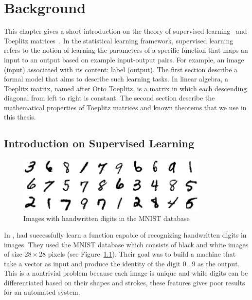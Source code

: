 \chapter{Background}
\label{chapter:background}
\localtableofcontents
\vspace{\marginbellowtable}

This chapter gives a short introduction on the theory of supervised learning~\cite{shalev2014understanding} and Toeplitz matrices~\cite{gray2006toeplitz}.
In the statistical learning framework, supervised learning refers to the notion of learning the parameters of a specific function that maps an input to an output based on example input-output pairs.
For example, an image (input) associated with its content: label (output).
The first section describe a formal model that aims to describe such learning tasks.
In linear algebra, a Toeplitz matrix, named after Otto Toeplitz, is a matrix in which each descending diagonal from left to right is constant.
The second section describe the mathematical properties of Toeplitz matrices and known theorems that we use in this thesis. 


\section{Introduction on Supervised Learning}
\label{section:ch2-introduction_on_supervised_learning}

\begin{figure}[h]
  \centering
  \includegraphics[width=0.85\textwidth]{figures/main/ch2-background/mnist-dataset.png}
  \caption{Images with handwritten digits in the MNIST database \cite{lecun1998gradient}}
  \label{figure:ch2-mnist-database}
\end{figure}


In \citeyear{lecun1998gradient}, \citeauthor{lecun1998gradient} had successfully learn a function capable of recognizing handwritten digits in images.
They used the MNIST database \cite{lecun1998gradient} which consists of black and white images of size $28 \times 28$ pixels (see Figure~\ref{figure:ch2-mnist-database}).
Their goal was to build a machine that take a vector as input and produce the identity of the digit $0 \dots 9$ as the output.
This is a nontrivial problem because each image is unique and while digits can be differentiated based on their shapes and strokes, these features gives poor results for an automated system. 

